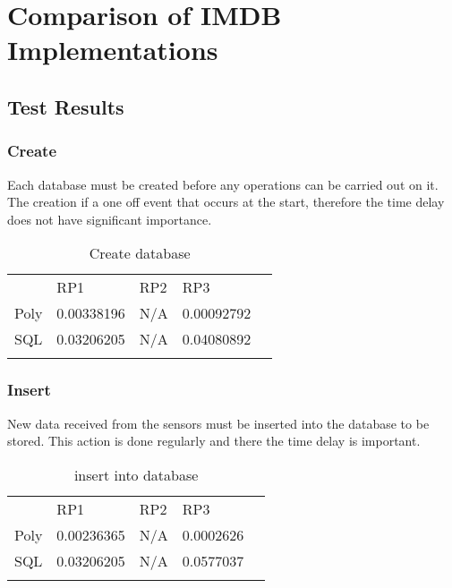 \chapter{Comparison of IMDB Implementations}
\pagestyle{aidan}

\section{Test Results}
\subsection{Create}
Each database must be created before any operations can be carried out on it. The creation if a one off event that occurs at the start, therefore the time delay does not have significant importance.  

\begin{table}[!htb]
\centering
\caption{Create database }
\label{Create}
\begin{tabular}{lllll}
     & RP1         & RP2 & RP3 &  \\
Poly & 0.00338196 & N/A    & 0.00092792    &  \\
SQL  & 0.03206205 & N/A    & 0.04080892    &  \\
     &             &     &     & 
\end{tabular}
\end{table}

\subsection{Insert}
New data received from the sensors must be inserted into the database to be stored. This action is done regularly and there the time delay is important. 
\begin{table}[!htb]
\centering
\caption{insert into database}
\label{insert}
\begin{tabular}{lllll}
     & RP1         & RP2 & RP3 &  \\
Poly & 0.00236365 & N/A    & 0.0002626    &  \\
SQL  & 0.03206205 & N/A    & 0.0577037    &  \\
     &             &     &     & 
\end{tabular}
\end{table}

